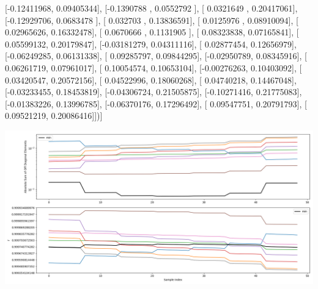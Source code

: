 \documentclass{article}
\begin{document}
       [-0.12411968,  0.09405344],
       [-0.1390788 ,  0.0552792 ],
       [ 0.0321649 ,  0.20417061],
       [-0.12929706,  0.0683478 ],
       [ 0.032703  ,  0.13836591],
       [ 0.0125976 ,  0.08910094],
       [ 0.02965626,  0.16332478],
       [ 0.0670666 ,  0.1131905 ],
       [ 0.08323838,  0.07165841],
       [ 0.05599132,  0.20179847],
       [-0.03181279,  0.04311116],
       [ 0.02877454,  0.12656979],
       [-0.06249285,  0.06131338],
       [ 0.09285797,  0.09844295],
       [-0.02950789,  0.08345916],
       [ 0.06261719,  0.07961017],
       [ 0.10054574,  0.10653104],
       [-0.00276263,  0.10403092],
       [ 0.03420547,  0.20572156],
       [ 0.04522996,  0.18060268],
       [ 0.04740218,  0.14467048],
       [-0.03233455,  0.18453819],
       [-0.04306724,  0.21505875],
       [-0.10271416,  0.21775083],
       [-0.01383226,  0.13996785],
       [-0.06370176,  0.17296492],
       [ 0.09547751,  0.20791793],
       [ 0.09521219,  0.20086416]])]
\begin{center}
\includegraphics[scale=.9]{report_pickled_controls148/control_dpn_all.png}

\end{center}
\end{document}
